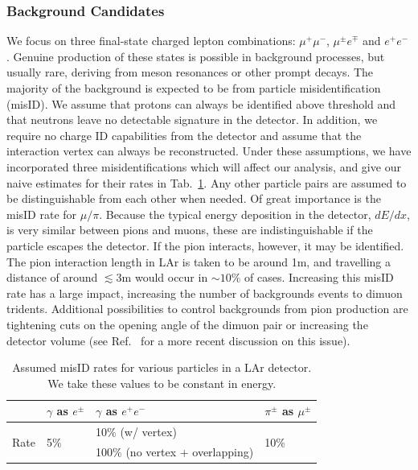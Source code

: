 \subsubsection{Background Candidates}
\label{subsubsec:misID}
We focus on three final-state charged lepton combinations: $\mu^+\mu^-$, $\mu^\pm e^\mp$ and $e^+e^-$. Genuine production of these states is possible in background processes, but usually rare, deriving from meson resonances or other prompt decays. The majority of the background is expected to be from particle misidentification (misID). We assume that protons can always be identified above threshold and that neutrons leave no detectable signature in the detector. In addition, we require no charge ID capabilities from the detector and assume that the interaction vertex can always be reconstructed. Under these assumptions, we have incorporated three misidentifications which will affect our analysis, and give our naive estimates for their rates in Tab.~\ref{tab:misIDlist}. Any other particle pairs are assumed to be distinguishable from each other when needed. Of great importance is the misID rate for $\mu/\pi$. Because the typical energy deposition in the detector, $dE/dx$, is very similar between pions and muons, these are indistinguishable if the
particle escapes the detector. If the pion interacts, however, it may be identified. The pion interaction length in LAr is taken to be around 1m, and travelling a distance
of around $\lesssim 3$m would occur in $\sim 10\%$ of cases. Increasing this misID rate has a large impact, increasing the number of backgrounds events to dimuon tridents. Additional possibilities to control backgrounds from pion production are tightening cuts on the opening angle of the dimuon pair or increasing the detector volume (see Ref.~\cite{Altmannshofer:2019zhy} for a more recent discussion on this issue).
%
\renewcommand{\arraystretch}{1.4}
\begin{table}[h]
\centering 
\begin{tabular}{clll}
\hline
 & $\gamma$ as $e^\pm$ & $\gamma$ as $e^+e^-$ & $\pi^\pm$ as $\mu^\pm$ \\
\hline
\multirow{2}{*}{Rate} & \multirow{2}{*}{5\%} & 10\% (w/ vertex) &  \multirow{2}{*}{10\%} \\
       &      & 100\% (no vertex + overlapping)  &  \\
\hline
\end{tabular}
\caption[Rates for particle misID in LAr.]{\label{tab:misIDlist} Assumed misID rates for various particles in a LAr detector. We take these values to be constant in energy.}
\end{table}

